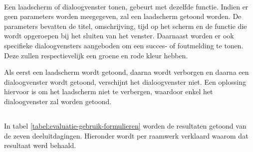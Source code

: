 \paragraph{\lungo}
Een laadscherm of dialoogvenster tonen, gebeurt met dezelfde functie.
Indien er geen parameters worden meegegeven, zal een laadscherm getoond worden.
De parameters bevatten de titel, omschrijving, tijd op het scherm en de functie die wordt opgeroepen bij het sluiten van het venster.
Daarnaast worden er ook specifieke dialoogvensters aangeboden om een succes- of foutmelding te tonen.
Deze zullen respectievelijk een groene en rode kleur hebben.

Als eerst een laadscherm wordt getoond, daarna wordt verborgen en daarna een dialoogvenster wordt getoond, verschijnt het dialoogvenster niet.
Een oplossing hiervoor is om het laadscherm niet te verbergen, waardoor enkel het dialoogvenster zal worden getoond.


\subsection{}
\label{sec:evaluatie-gebruik-formulieren}

In tabel \ref{tabel:evaluatie-gebruik-formulieren} worden de resultaten getoond van de zeven deeluitdagingen.
Hieronder wordt per raamwerk verklaard waarom dat resultaat werd behaald.

\begin{table}
\centering
{}
\caption{Gebruik van .}
\label{tabel:evaluatie-gebruik-formulieren}
\end{table}

